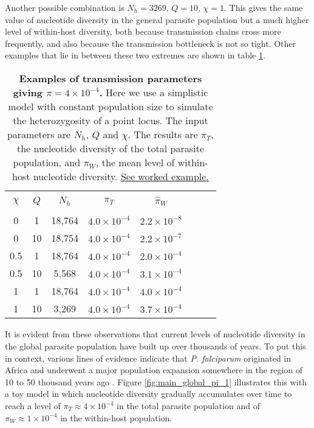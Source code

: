 \documentclass[_main.tex]{subfiles}
\begin{document}
Another possible combination is $N_h = 3269$, $Q = 10$, $\chi = 1$.  This gives the same value of nucleotide diversity in the general parasite population but a much higher level of within-host diversity, both because transmission chains cross more frequently, and also because the transmission bottleneck is not so tight.  Other examples that lie in between these two extremes are shown in table \ref{table:comb_of_trans_var}.

 \begin{table}[h!] 
\centering
\small{
\begin{tabular}{c c c c c c c c} 
\hline \\
$\chi$ & $Q$ & $N_h$ & $\pi_T$ & $\widehat{\pi}_W$ \\ [0.5ex] 
\hline \\
0 & 1 & 18,764 & $4.0 \times 10^{-4}$ & $2.2 \times 10^{-8}$ \\ [2ex]
0 & 10 & 18,754 & $4.0 \times 10^{-4}$ & $2.2 \times 10^{-7}$ \\ [2ex]
0.5 & 1 & 18,764 & $4.0 \times 10^{-4}$ & $2.0 \times 10^{-4}$ \\ [2ex]
0.5 & 10 & 5,568 & $4.0 \times 10^{-4}$ & $3.1 \times 10^{-4}$ \\ [2ex]
1 & 1 & 18,764 & $4.0 \times 10^{-4}$ & $4.0 \times 10^{-4}$ \\ [2ex]
1 & 10 & 3,269 & $4.0 \times 10^{-4}$ & $3.7 \times 10^{-4}$ \\ [2ex]
\hline
\end{tabular}
}
\caption{\small{\textbf{Examples of transmission parameters giving $\pi = 4 \times 10^{-4}$.}  Here we use a simplistic model with constant population size to simulate the heterozygosity of a point locus.  The input parameters are $N_h$, $Q$ and $\chi$.  The results are $\pi_T$, the nucleotide diversity of the total parasite population, and $\widehat{\pi}_W$, the mean level of within-host nucleotide diversity.  \href{https://d-kwiat.github.io/gtg/nucleotide-diversity.html}{See worked example.}}}
\label{table:comb_of_trans_var}
\end{table}

It is evident from these observations that current levels of nucleotide diversity in the global parasite population have built up over thousands of years.  To put this in context, various lines of evidence indicate that \textit{P. falciparum} originated in Africa and underwent a major population expansion somewhere in the region of 10 to 50 thousand years ago \cite{Joy2003,Tanabe2010}.  Figure  \ref{fig:main_global_pi_1} illustrates this with a toy model in which nucleotide diversity gradually accumulates over time to reach a level of $\pi_T \approx 4 \times 10^{-4}$ in the total parasite population and of $\pi_W \approx 1 \times 10^{-4}$ in the within-host population. 
\end{document}
